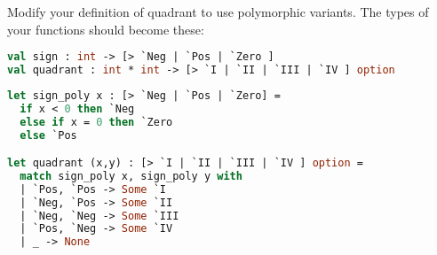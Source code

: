 Modify your definition of quadrant to use polymorphic variants. The types of your functions should become these:
\begin{lstlisting}[language=OCaml]
val sign : int -> [> `Neg | `Pos | `Zero ]
val quadrant : int * int -> [> `I | `II | `III | `IV ] option
\end{lstlisting}

\begin{lstlisting}[language=OCaml]
let sign_poly x : [> `Neg | `Pos | `Zero] =
  if x < 0 then `Neg
  else if x = 0 then `Zero
  else `Pos

let quadrant (x,y) : [> `I | `II | `III | `IV ] option =
  match sign_poly x, sign_poly y with
  | `Pos, `Pos -> Some `I
  | `Neg, `Pos -> Some `II
  | `Neg, `Neg -> Some `III
  | `Pos, `Neg -> Some `IV
  | _ -> None
\end{lstlisting}

